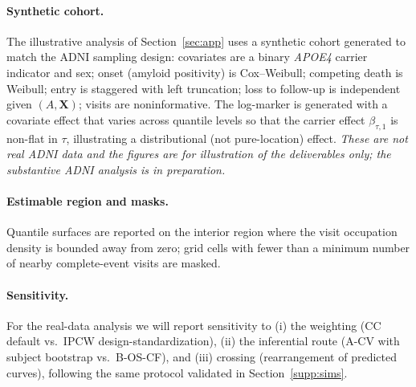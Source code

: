 \documentclass[11pt]{article}
\theoremstyle{remark}\newtheorem{remark}{Remark}
\newcommand{\X}{\bm{X}}
\begin{document}
\paragraph{Synthetic cohort.} The illustrative analysis of Section~\ref{sec:app}
uses a synthetic cohort generated to match the ADNI sampling design: covariates are
a binary \emph{APOE4} carrier indicator and sex; onset (amyloid positivity) is
Cox--Weibull; competing death is Weibull; entry is staggered with left truncation;
loss to follow-up is independent given $(A,\X)$; visits are noninformative. The
log-marker is generated with a covariate effect that varies across quantile levels
so that the carrier effect $\beta_{\tau,1}$ is non-flat in $\tau$, illustrating a
distributional (not pure-location) effect. \emph{These are not real ADNI data and
the figures are for illustration of the deliverables only; the substantive ADNI
analysis is in preparation.}

\paragraph{Estimable region and masks.} Quantile surfaces are reported on the
interior region where the visit occupation density is bounded away from zero; grid
cells with fewer than a minimum number of nearby complete-event visits are masked.

\paragraph{Sensitivity.} For the real-data analysis we will report sensitivity to
(i) the weighting (CC default vs.\ IPCW design-standardization), (ii) the
inferential route (A-CV with subject bootstrap vs.\ B-OS-CF), and (iii) crossing
(rearrangement of predicted curves), following the same protocol validated in
Section~\ref{supp:sims}.
\end{document}
